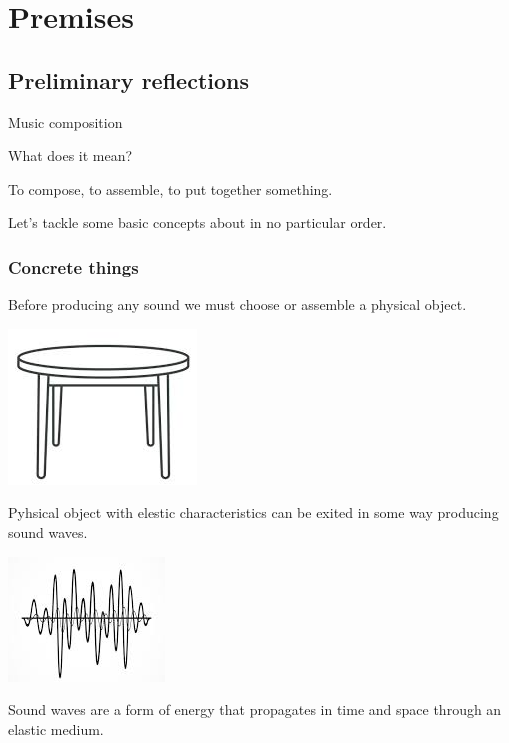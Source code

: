 \chapter{Premises}

\section{Preliminary reflections}\label{preliminary-reflections}

Music composition

What does it mean?

To compose, to assemble, to put together something.

Let's tackle some basic concepts about in no particular order.

\subsection{Concrete things}\label{concrete-things}

Before producing any sound we must choose or assemble a physical object.

\begin{center}
\includegraphics[scale=0.45]{../img/tavolo.png}
\end{center}

Pyhsical object with elestic characteristics can be exited in some way producing sound waves.

\begin{center}
\includegraphics[scale=0.55]{../img/pelle.png}
\end{center}

Sound waves are a form of energy that propagates in time and space through an elastic medium.

